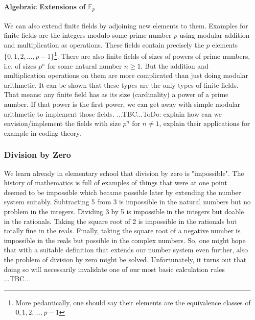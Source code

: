 \paragraph{Algebraic Extensions of $\mathbb{F}_p$} We can also extend finite fields by adjoining new elements to them. Examples for finite fields are the integers modulo some prime number $p$ using modular addition and multiplication as operations. These fields contain precisely the $p$ elements $\{0,1,2,\ldots,p-1\}$\footnote{More pedantically, one should say their elements are the equivalence classes of $0,1,2,\ldots,p-1$}. There are also finite fields of sizes of powers of prime numbers, i.e. of sizes $p^n$ for some natural number $n \geq 1$. But the addition and multiplication operations on them are more complicated than just doing modular arithmetic. It can be shown that these types are the only types of finite fields. That means: any finite field has as its size (cardinality) a power of a prime number. If that power is the first power, we can get away with simple modular arithmetic to implement those fields. ...TBC...ToDo: explain how can we envision/implement the fields with size $p^n$ for $n \neq 1$, explain their applications for example in coding theory.




\subsubsection{Division by Zero}
We learn already in elementary school that division by zero is "impossible". The history of mathematics is full of examples of things that were at one point deemed to be impossible which became possible later by extending the number system suitably. Subtracting 5 from 3 is impossible in the natural numbers but no problem in the integers. Dividing 3 by 5 is impossible in the integers but doable in the rationals. Taking the square root of 2 is impossible in the rationals but totally fine in the reals. Finally, taking the square root of a negative number is impossible in the reals but possible in the complex numbers. So, one might hope that with a suitable definition that extends our number system even further, also the problem of division by zero might be solved. Unfortunately, it turns out that doing so will necessarily invalidate one of our most basic calculation rules ...TBC...

